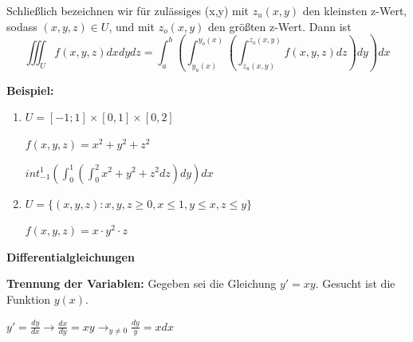 \documentclass[fontset=ubuntu,12pt,a4paper,fleqn]{article}
\begin{document}
Schließlich bezeichnen wir für zulässiges (x,y) mit \(z_u(x,y)\) den kleinsten z-Wert, sodass \((x,y,z)\in U\), und mit \(z_o(x,y)\) den größten z-Wert. Dann ist \[\iiint_U f(x,y,z)dxdydz=\int_a^b \left(\int_{y_u(x)}^{y_o(x)} \left(\int_{z_u(x,y)}^{z_o(x,y)} f(x,y,z)dz\right)dy\right)dx\]

\textbf{Beispiel:}
\begin{multicols}{2}
	\begin{enumerate}
		\item \(U=[-1;1]\times[0,1]\times[0,2]\)
		
		\(f(x,y,z)=x^2+y^2+z^2\)
		
		\(int_{-1}^1 \left(\int_0^1 \left(\int_0^2 x^2+y^2+z^2dz \right)dy \right)dx\)
		
		\item \(U=\{(x,y,z):x,y,z \ge 0,x \le 1,y \le x,z \le y\}\)
		
		\(f(x,y,z)=x\cdot y^2 \cdot z\)
	\end{enumerate}
\end{multicols}
 


\newpage















{\Large\textbf{Differentialgleichungen}\par}
\textbf{Trennung der Variablen:} 
Gegeben sei die Gleichung \(y'=xy\).
Gesucht ist die Funktion \(y(x)\).

\(y'=\frac{dy}{dx} \to \frac{dx}{dy}=xy \to_{y \ne 0} \frac{dy}{y}=xdx\)\\
\end{document}

